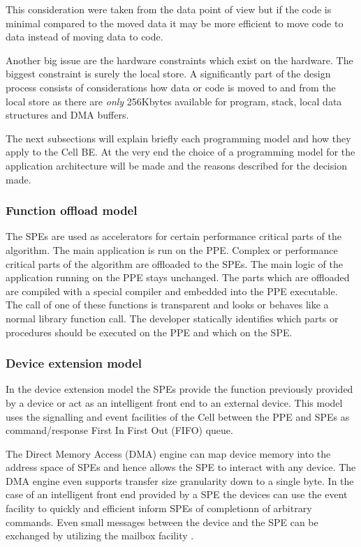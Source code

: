 \documentclass[DIV10, abstracton, openright, footsepline, headsepline, twoside, 9pt,
bigheadings]{scrreprt}
\begin{document}
This consideration were taken from the data point of view but if the code
is minimal compared to the moved data it may be more efficient to move
code to data instead of moving data to code.

Another big issue are the hardware constraints which exist on the hardware.
The biggest constraint is surely the local store. A significantly part of the
design process consists of considerations how data or code is moved to and from
the local store as there are \textit{only} 256Kbytes available for program, stack,
local data structures and DMA buffers.

The next subsections will explain briefly each programming model and how they
apply to the Cell BE. At the very end the choice of a programming model
for the application architecture will be made and the reasons described for
the decision made.


\subsubsection*{Function offload model}
The SPEs are used as accelerators for certain performance critical parts of the
algorithm. The main application is run on the PPE. Complex or performance
critical parts of the algorithm are offloaded to the SPEs. The main logic of
the application running on the PPE stays unchanged. The parts which are
offloaded are compiled with a special compiler and embedded into the PPE
executable. The call of one of these functions is transparent and looks or
behaves like a normal library function call. The developer statically identifies
which parts or procedures should be executed on the PPE and which on the SPE.

\subsubsection*{Device extension model}
In the device extension model the SPEs provide the function previously
provided by a device or act as an intelligent front end to an external device.
This model uses the signalling and event facilities of the Cell between the PPE
and SPEs as command/response First In First Out (FIFO) queue.

The Direct Memory Access (DMA) engine can map device memory into the address space
of SPEs and hence allows the SPE to interact with any device. The DMA engine even
supports transfer size granularity down to a single byte. In the case of an
intelligent front end provided by a SPE the devices can use the event facility to
quickly and efficient inform SPEs of completionn of arbitrary commands. Even small
messages between the device and the SPE can be exchanged by utilizing the mailbox
facility \cite{Kahle05}.
\end{document}

